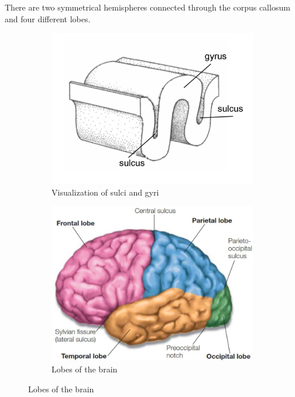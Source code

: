 \begin{description}
\begin{description}
            There are two symmetrical hemispheres connected through the corpus callosum and four different lobes.

            \begin{figure}[H]
                \centering
                \begin{subfigure}{0.25\linewidth}
                    \centering
                    \includegraphics[width=\linewidth]{./img/brain_surface.png}
                    \caption{Visualization of sulci and gyri}
                \end{subfigure}
                \begin{subfigure}{0.35\linewidth}
                    \centering
                    \includegraphics[width=\linewidth]{./img/brain_lobes.png}
                    \caption{Lobes of the brain}
                \end{subfigure}
            \end{figure}


\end{description}
\end{description}
